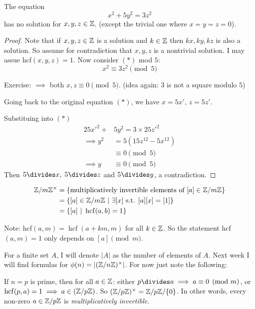 \documentclass[10pt]{scrartcl}
\DeclareMathOperator{\hcf}{hcf}
\begin{document}
\begin{example}
The equation
\[x^2 + 5y^2 = 3z^2 \tag{$*$}\]	
has no solution for $x,y,z \in\mathbb{Z}$. (except the trivial one where $x = y = z = 0$).

\begin{proof}
Note that if $x,y,z \in\mathbb{Z}$ is a solution and $k\in\mathbb{Z}$ then $kx,ky, kz$ is also a solution. So assume for contradiction that $x,y,z$ is a nontrivial solution. I may assue hcf$(x,y,z) = 1$. Now consider $(*)$ mod $5$: 
\[x^2 \equiv 3z^2 \pmod{5}\]

Exercise: $\implies$ both $x,z \equiv 0 \pmod{5}$. (idea again: $3$ is not a square modulo $5$)

Going back to the original equation $(*)$, we have $x = 5x'$, $z = 5z'$. 

Substituing into $(*)$
\[
\begin{aligned}
  25x'^2 +& 5y^2 = 3\times 25 z'^2\\
  \implies y^2 &= 5 (15 z^{12} - 5x^{12})\\
  &\equiv 0 \pmod{5}\\
  \implies y &\equiv0 \pmod{5}
\end{aligned}
\]
Then $5 \divides x,\; 5 \divides z$ and $5\divides y$, a contradiction.
\end{proof}
\end{example}\vspace*{5pt}


\begin{definition} 
\[
\begin{aligned}
  \Z / m\Z^\times &= \{\text{multiplicatively invertible elements of } [a] \in \Z / m \Z\}\\
  &= \{[a] \in \Z / m \Z ~|~ \exists [x] \text{ s.t. } [a][x] = [1]\}\\
  &= \{[a] ~|~ \hcf(a,b) = 1\}
\end{aligned}
\]
\end{definition}

Note: hcf$(a,m) = \hcf(a + km, m)$ for all $k \in\mathbb{Z}$. So the statement hcf$(a,m) = 1$ only depends on $[a] \pmod{m}$. 

For a finite set $A$, I will denote $|A|$ as the number of elements of $A$. Next week I will find formulas for $\phi(n) = |(\mathbb{Z}/ n\mathbb{Z})^\times |$. For now just note the following:

 If $n = p$ is prime, then for all $a \in\mathbb{Z}$: either $p \divides a \implies a \equiv 0 \pmod{m}$, or $\hcf(p,a) = 1 \implies a \in (\Z / p\Z)$. So $(\mathbb{Z} / p\mathbb{Z})^\times = \mathbb{Z} / p\mathbb{Z} / \{0\}$. In other words, every non-zero $a \in \mathbb{Z} / p\mathbb{Z}$ is \emph{multiplicatively invertible}. 
\end{document}
